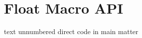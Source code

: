 \documentclass[a4paper,12pt]{report}
\begin{document}
\chapter{Float Macro API}
\begin{codeWithoutLabel}{text}
unnumbered direct code in main matter
\end{codeWithoutLabel}
\end{document}
